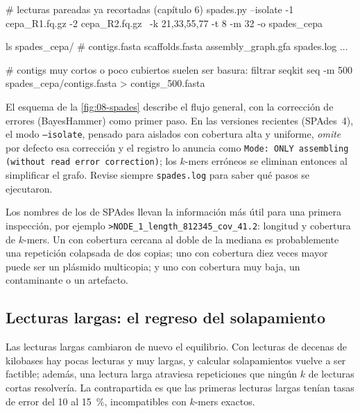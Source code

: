\begin{consola}
# lecturas pareadas ya recortadas (capítulo 6)
spades.py --isolate -1 cepa_R1.fq.gz -2 cepa_R2.fq.gz \
    -k 21,33,55,77 -t 8 -m 32 -o spades_cepa

ls spades_cepa/
# contigs.fasta  scaffolds.fasta  assembly_graph.gfa  spades.log ...

# contigs muy cortos o poco cubiertos suelen ser basura: filtrar
seqkit seq -m 500 spades_cepa/contigs.fasta > contigs_500.fasta
\end{consola}

\begin{cuidado}
El esquema de la \cref{fig:08-spades} describe el flujo general, con la corrección de errores (BayesHammer) como primer paso. En las versiones recientes (SPAdes~4), el modo \texttt{--isolate}, pensado para aislados con cobertura alta y uniforme, \emph{omite} por defecto esa corrección y el registro lo anuncia como \texttt{Mode: ONLY assembling (without read error correction)}; los $k$-mers erróneos se eliminan entonces al simplificar el grafo. Revise siempre \texttt{spades.log} para saber qué pasos se ejecutaron.
\end{cuidado}

Los nombres de los  de SPAdes llevan la información más útil para una primera inspección, por ejemplo \texttt{>NODE\_1\_length\_812345\_cov\_41.2}: longitud y cobertura de $k$-mers. Un  con cobertura cercana al doble de la mediana es probablemente una repetición colapsada de dos copias; uno con cobertura diez veces mayor puede ser un plásmido multicopia; y uno con cobertura muy baja, un contaminante o un artefacto.

\subsection{Lecturas largas: el regreso del solapamiento}

Las lecturas largas cambiaron de nuevo el equilibrio. Con lecturas de decenas de kilobases hay pocas lecturas y muy largas, y calcular solapamientos vuelve a ser factible; además, una lectura larga atraviesa repeticiones que ningún $k$ de lecturas cortas resolvería. La contrapartida es que las primeras lecturas largas tenían tasas de error del 10 al \SI{15}{\percent}, incompatibles con $k$-mers exactos.


